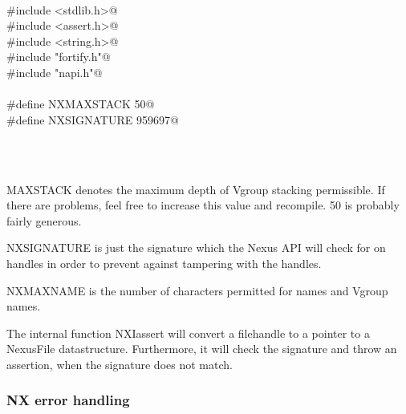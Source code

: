 \documentclass[12pt]{article}
\begin{document}
\begin{flushleft} \small
\begin{minipage}{\linewidth} \label{scrap27}
\vspace{-1ex}
\begin{list}{}{} \item
\mbox{}\verb@@\\
\mbox{}\verb@#include <stdlib.h>@\\
\mbox{}\verb@#include <assert.h>@\\
\mbox{}\verb@#include <string.h>@\\
\mbox{}\verb@#include "fortify.h"@\\
\mbox{}\verb@#include "napi.h"@\\
\mbox{}\verb@@\\
\mbox{}\verb@#define NXMAXSTACK 50@\\
\mbox{}\verb@#define NXSIGNATURE 959697@\\
\mbox{}\verb@@\\
\end{list}
\vspace{-1ex}
\footnotesize\addtolength{\baselineskip}{-1ex}
\end{minipage}\\[4ex]
\end{flushleft}
MAXSTACK denotes the maximum depth of Vgroup stacking permissible. If there
are problems, feel free to increase this value and recompile. 50 is probably
fairly generous.

NXSIGNATURE is just the signature which the Nexus API will check for on
handles in order to prevent against tampering with the handles.

NXMAXNAME is the number of characters permitted for names and Vgroup names.

The internal function NXIassert will convert a filehandle to a pointer
to a NexusFile datastructure. Furthermore, it will check the signature and
throw an assertion, when the signature does not match.


\subsubsection{NX error handling}
\end{document}
